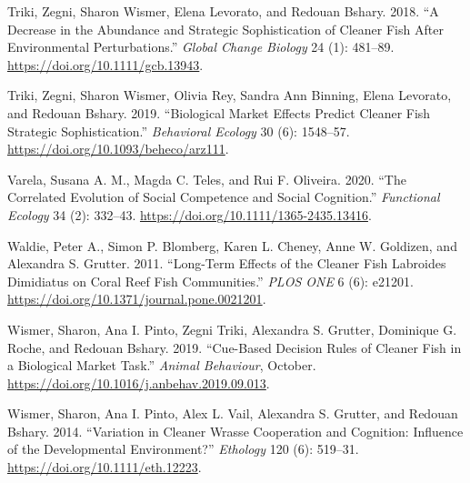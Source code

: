 \documentclass[
  12pt,
]{article}
\newlength{\cslhangindent}
\newlength{\cslentryspacingunit} %
\newenvironment{CSLReferences}[2] %
 {%
  \setlength{\parindent}{0pt}
  \ifodd #1
  \let\oldpar\par
  \def\par{\hangindent=\cslhangindent\oldpar}
  \fi
  \setlength{\parskip}{#2\cslentryspacingunit}
 }%
 {}
\begin{document}
\begin{CSLReferences}{1}{0}
\leavevmode{}%
Triki, Zegni, Sharon Wismer, Elena Levorato, and Redouan Bshary. 2018.
{``A Decrease in the Abundance and Strategic Sophistication of Cleaner
Fish After Environmental Perturbations.''} \emph{Global Change Biology}
24 (1): 481--89. \url{https://doi.org/10.1111/gcb.13943}.

\leavevmode{}%
Triki, Zegni, Sharon Wismer, Olivia Rey, Sandra Ann Binning, Elena
Levorato, and Redouan Bshary. 2019. {``Biological Market Effects Predict
Cleaner Fish Strategic Sophistication.''} \emph{Behavioral Ecology} 30
(6): 1548--57. \url{https://doi.org/10.1093/beheco/arz111}.

\leavevmode{}%
Varela, Susana A. M., Magda C. Teles, and Rui F. Oliveira. 2020. {``The
Correlated Evolution of Social Competence and Social Cognition.''}
\emph{Functional Ecology} 34 (2): 332--43.
\url{https://doi.org/10.1111/1365-2435.13416}.

\leavevmode{}%
Waldie, Peter A., Simon P. Blomberg, Karen L. Cheney, Anne W. Goldizen,
and Alexandra S. Grutter. 2011. {``Long-{Term} {Effects} of the
{Cleaner} {Fish} {Labroides} Dimidiatus on {Coral} {Reef} {Fish}
{Communities}.''} \emph{PLOS ONE} 6 (6): e21201.
\url{https://doi.org/10.1371/journal.pone.0021201}.

\leavevmode{}%
Wismer, Sharon, Ana I. Pinto, Zegni Triki, Alexandra S. Grutter,
Dominique G. Roche, and Redouan Bshary. 2019. {``Cue-Based Decision
Rules of Cleaner Fish in a Biological Market Task.''} \emph{Animal
Behaviour}, October.
\url{https://doi.org/10.1016/j.anbehav.2019.09.013}.

\leavevmode{}%
Wismer, Sharon, Ana I. Pinto, Alex L. Vail, Alexandra S. Grutter, and
Redouan Bshary. 2014. {``Variation in {Cleaner} {Wrasse} {Cooperation}
and {Cognition}: {Influence} of the {Developmental} {Environment}?''}
\emph{Ethology} 120 (6): 519--31.
\url{https://doi.org/10.1111/eth.12223}.

\end{CSLReferences}
\end{document}
